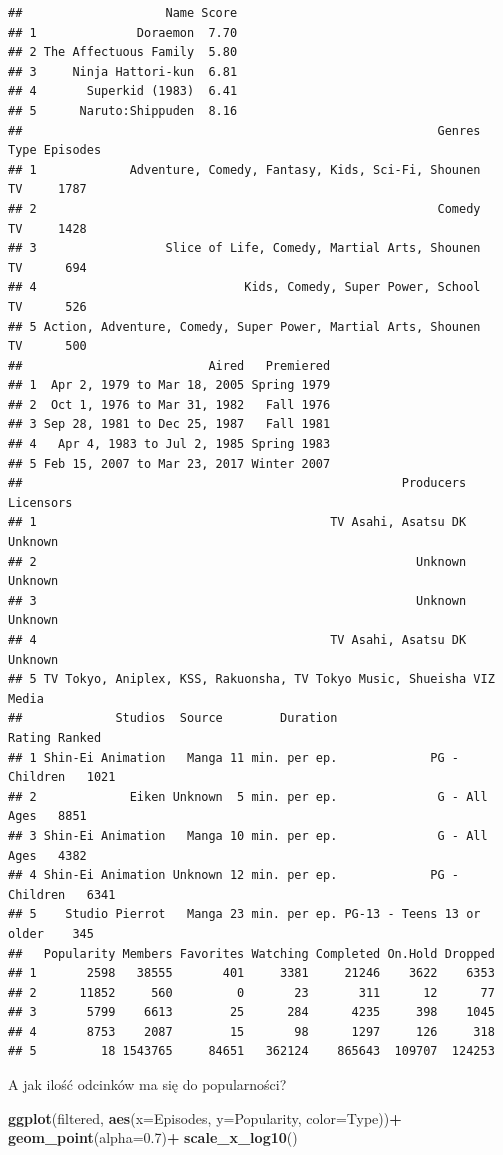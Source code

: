 \documentclass[
]{article}
\newenvironment{Shaded}{\begin{snugshade}}{\end{snugshade}}
\newcommand{\AttributeTok}[1]{\textcolor[rgb]{0.13,0.29,0.53}{#1}}
\newcommand{\FloatTok}[1]{\textcolor[rgb]{0.00,0.00,0.81}{#1}}
\newcommand{\FunctionTok}[1]{\textcolor[rgb]{0.13,0.29,0.53}{\textbf{#1}}}
\newcommand{\NormalTok}[1]{#1}
\newcommand{\SpecialCharTok}[1]{\textcolor[rgb]{0.81,0.36,0.00}{\textbf{#1}}}
\begin{document}
\begin{verbatim}
##                    Name Score
## 1              Doraemon  7.70
## 2 The Affectuous Family  5.80
## 3     Ninja Hattori-kun  6.81
## 4       Superkid (1983)  6.41
## 5      Naruto:Shippuden  8.16
##                                                          Genres Type Episodes
## 1             Adventure, Comedy, Fantasy, Kids, Sci-Fi, Shounen   TV     1787
## 2                                                        Comedy   TV     1428
## 3                  Slice of Life, Comedy, Martial Arts, Shounen   TV      694
## 4                             Kids, Comedy, Super Power, School   TV      526
## 5 Action, Adventure, Comedy, Super Power, Martial Arts, Shounen   TV      500
##                          Aired   Premiered
## 1  Apr 2, 1979 to Mar 18, 2005 Spring 1979
## 2  Oct 1, 1976 to Mar 31, 1982   Fall 1976
## 3 Sep 28, 1981 to Dec 25, 1987   Fall 1981
## 4   Apr 4, 1983 to Jul 2, 1985 Spring 1983
## 5 Feb 15, 2007 to Mar 23, 2017 Winter 2007
##                                                     Producers Licensors
## 1                                         TV Asahi, Asatsu DK   Unknown
## 2                                                     Unknown   Unknown
## 3                                                     Unknown   Unknown
## 4                                         TV Asahi, Asatsu DK   Unknown
## 5 TV Tokyo, Aniplex, KSS, Rakuonsha, TV Tokyo Music, Shueisha VIZ Media
##             Studios  Source        Duration                    Rating Ranked
## 1 Shin-Ei Animation   Manga 11 min. per ep.             PG - Children   1021
## 2             Eiken Unknown  5 min. per ep.              G - All Ages   8851
## 3 Shin-Ei Animation   Manga 10 min. per ep.              G - All Ages   4382
## 4 Shin-Ei Animation Unknown 12 min. per ep.             PG - Children   6341
## 5    Studio Pierrot   Manga 23 min. per ep. PG-13 - Teens 13 or older    345
##   Popularity Members Favorites Watching Completed On.Hold Dropped
## 1       2598   38555       401     3381     21246    3622    6353
## 2      11852     560         0       23       311      12      77
## 3       5799    6613        25      284      4235     398    1045
## 4       8753    2087        15       98      1297     126     318
## 5         18 1543765     84651   362124    865643  109707  124253
\end{verbatim}

A jak ilość odcinków ma się do popularności?

\begin{Shaded}
\begin{Highlighting}[]
\FunctionTok{ggplot}\NormalTok{(filtered, }\FunctionTok{aes}\NormalTok{(}\AttributeTok{x=}\NormalTok{Episodes, }\AttributeTok{y=}\NormalTok{Popularity, }\AttributeTok{color=}\NormalTok{Type))}\SpecialCharTok{+}
  \FunctionTok{geom\_point}\NormalTok{(}\AttributeTok{alpha=}\FloatTok{0.7}\NormalTok{)}\SpecialCharTok{+}
  \FunctionTok{scale\_x\_log10}\NormalTok{()}
\end{Highlighting}
\end{Shaded}
\end{document}
